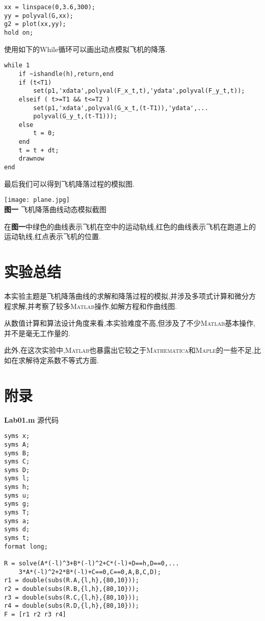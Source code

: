 \documentclass[a4paper,12pt]{article}
\begin{document}
\begin{CJK*}{UTF8}{gbsn}
\begin{lstlisting}
xx = linspace(0,3.6,300);
yy = polyval(G,xx);
g2 = plot(xx,yy);
hold on;
\end{lstlisting}
\vspace{7pt}
\par 使用如下的While循环可以画出动点模拟飞机的降落.
\vspace{-11pt}
\begin{lstlisting}
while 1
    if ~ishandle(h),return,end
    if (t<T1)
        set(p1,'xdata',polyval(F_x_t,t),'ydata',polyval(F_y_t,t));
    elseif ( t>=T1 && t<=T2 )
        set(p1,'xdata',polyval(G_x_t,(t-T1)),'ydata',...
        polyval(G_y_t,(t-T1)));
    else
        t = 0;
    end
    t = t + dt;
    drawnow
end
\end{lstlisting}
\vspace{7pt}
\par 最后我们可以得到飞机降落过程的模拟图.
\begin{center}
\texttt{[image: plane.jpg]}\\
\textbf{图一} 飞机降落曲线动态模拟截图\\
\end{center}
\par 在\textbf{图一}中绿色的曲线表示飞机在空中的运动轨线,红色的曲线表示飞机在跑道上的运动轨线,红点表示飞机的位置.
\section{实验总结}
本实验主题是飞机降落曲线的求解和降落过程的模拟,并涉及多项式计算和微分方程求解,并考察了较多\textsc{Matlab}操作,如解方程和作曲线图.\par 从数值计算和算法设计角度来看,本实验难度不高,但涉及了不少\textsc{Matlab}基本操作,并不是毫无工作量的.\par 此外,在这次实验中,\textsc{Matlab}也暴露出它较之于\textsc{Mathematica}和\textsc{Maple}的一些不足,比如在求解待定系数不等式方面.

\section{附录}
\noindent\textbf{Lab01.m} 源代码
\vspace{-10pt}
\lstset{basicstyle=\ttfamily\footnotesize,escapechar=`}
\begin{lstlisting}
syms x;
syms A;
syms B;
syms C;
syms D;
syms l;
syms h;
syms u;
syms g;
syms T;
syms a;
syms d;
syms t;
format long;

R = solve(A*(-l)^3+B*(-l)^2+C*(-l)+D==h,D==0,...
    3*A*(-l)^2+2*B*(-l)+C==0,C==0,A,B,C,D);
r1 = double(subs(R.A,{l,h},{80,10}));
r2 = double(subs(R.B,{l,h},{80,10}));
r3 = double(subs(R.C,{l,h},{80,10}));
r4 = double(subs(R.D,{l,h},{80,10}));
F = [r1 r2 r3 r4]


\end{lstlisting}
\end{CJK*}
\end{document}
